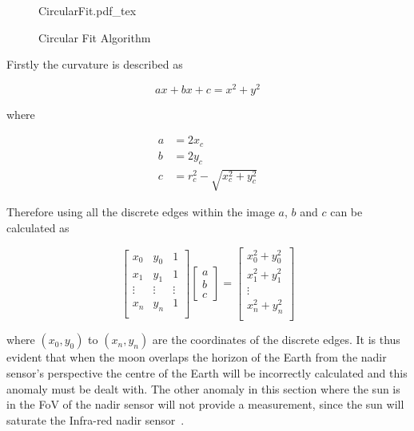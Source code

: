 \begin{figure}[!hbt]
	\centering
	\def\svgwidth{14cm}
	{CircularFit.pdf_tex}
	\caption{Circular Fit Algorithm}
	\label{fig:CircularFit}
\end{figure}

Firstly the curvature is described as 

\begin{equation}
	ax + bx + c = x^2 + y^2
\end{equation}

where 

\begin{equation}
	\begin{aligned}
		a &= 2x_c \\
		b &= 2y_c \\
		c &= r_c^2-\sqrt{x_c^2 + y_c^2}
	\end{aligned}
\end{equation}

Therefore using all the discrete edges within the image $a$, $b$ and $c$ can be calculated as

\begin{equation}
	\begin{bmatrix}
		x_0 & y_0 & 1\\
		x_1 & y_1 & 1\\
		\vdots & \vdots & \vdots\\
		x_n & y_n & 1\\
	\end{bmatrix}	\begin{bmatrix}
	a\\
	b\\
	c
\end{bmatrix} = \begin{bmatrix}
		x_0^2 + y_0^2\\
		x_1^2 + y_1^2\\
		\vdots \\
		x_n^2 + y_n^2\\
	\end{bmatrix}
\end{equation}

where $(x_0,y_0)$ to $(x_n, y_n)$ are the coordinates of the discrete edges. It is thus evident that when the moon overlaps the horizon of the Earth from the nadir sensor's perspective the centre of the Earth will be incorrectly calculated and this anomaly must be dealt with. The other anomaly in this section where the sun is in the FoV of the nadir sensor will not provide a measurement, since the sun will saturate the Infra-red nadir sensor~\cite{Wessels2018}.

